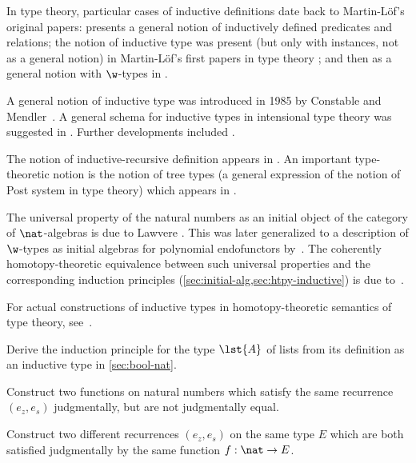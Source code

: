 In type theory, particular cases of inductive definitions date back to Martin-L\"of's original papers: \cite{martin-lof-hauptsatz} presents a general notion of inductively defined predicates and relations; the notion of inductive type was present (but only with instances, not as a general notion) in Martin-L\"of's first papers in type theory \cite{Martin-Lof-1973};
and then as a general notion with $\w$-types in \cite{Martin-Lof-1979}.%

A general notion of inductive type was introduced in 1985 by Constable and Mendler~\cite{DBLP:conf/lop/ConstableM85}.  A general schema for inductive types in intensional type theory was suggested in
\cite{PfenningPaulinMohring}.  Further developments included \cite{CoquandPaulin, Dybjer:1991}.

The notion of inductive-recursive definition appears in \cite{Dybjer:2000}. An important  type-theoretic notion is the notion of tree types (a general expression of the notion of Post system in type theory) which appears in \cite{PeterssonSynek}.

The universal property of the natural numbers as an initial object of the category of $\nat$-algebras is due to Lawvere \cite{lawvere:adjinfound}.
This was later generalized to a description of $\w$-types as initial algebras for polynomial endofunctors by~\cite{mp:wftrees}.
The coherently homotopy-theoretic equivalence between such universal properties and the corresponding induction principles (\cref{sec:initial-alg,sec:htpy-inductive}) is due to~\cite{ags:it-hott}.

For actual constructions of inductive types in homotopy-theoretic semantics of type theory, see~\cite{klv:ssetmodel,mvdb:wtypes,ls:hits}.

\sectionExercises

\begin{ex}\label{ex:ind-lst}
  Derive the induction principle for the type $\lst{A}$ of lists from its definition as an inductive type in \cref{sec:bool-nat}.
\end{ex}

\begin{ex}\label{ex:same-recurrence-not-defeq}
  Construct two functions on natural numbers which satisfy the same recurrence $(e_z, e_s)$ judgmentally, but are not judgmentally equal.
\end{ex}

\begin{ex}\label{ex:one-function-two-recurrences}
  Construct two different recurrences $(e_z,e_s)$ on the same type $E$ which are both satisfied judgmentally by the same function $f:\nat\to E$.
\end{ex}

